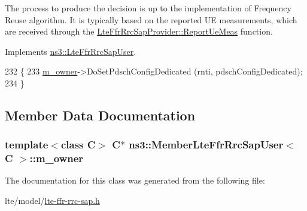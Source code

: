 The process to produce the decision is up to the implementation of Frequency Reuse algorithm. It is typically based on the reported UE measurements, which are received through the \hyperlink{classns3_1_1LteFfrRrcSapProvider_aefa0779641b8432a7d3406b519ca7e59}{Lte\+Ffr\+Rrc\+Sap\+Provider\+::\+Report\+Ue\+Meas} function. 

Implements \hyperlink{classns3_1_1LteFfrRrcSapUser_a9909ef4226b3192d61dd48f31673c314}{ns3\+::\+Lte\+Ffr\+Rrc\+Sap\+User}.


\begin{DoxyCode}
232 \{
233   \hyperlink{classns3_1_1MemberLteFfrRrcSapUser_acfd07f43cc8a1b060bc7d44abec07975}{m\_owner}->DoSetPdschConfigDedicated (rnti, pdschConfigDedicated);
234 \}
\end{DoxyCode}


\subsection{Member Data Documentation}
\subsubsection[{\texorpdfstring{m\+\_\+owner}{m_owner}}]{\setlength{\rightskip}{0pt plus 5cm}template$<$class C$>$ {\bf C}$\ast$ {\bf ns3\+::\+Member\+Lte\+Ffr\+Rrc\+Sap\+User}$<$ {\bf C} $>$\+::m\+\_\+owner\hspace{0.3cm}{\ttfamily [private]}}\hypertarget{classns3_1_1MemberLteFfrRrcSapUser_acfd07f43cc8a1b060bc7d44abec07975}{}\label{classns3_1_1MemberLteFfrRrcSapUser_acfd07f43cc8a1b060bc7d44abec07975}


The documentation for this class was generated from the following file\+:\begin{DoxyCompactItemize}
\item 
lte/model/\hyperlink{lte-ffr-rrc-sap_8h}{lte-\/ffr-\/rrc-\/sap.\+h}\end{DoxyCompactItemize}
